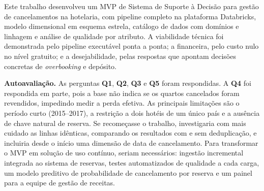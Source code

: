\documentclass[11pt,a4paper]{article}
\newcommand{\Q}[1]{\textbf{Q#1}}
\begin{document}
Este trabalho desenvolveu um MVP de Sistema de Suporte à Decisão para gestão de cancelamentos na hotelaria, com pipeline completo na plataforma Databricks, modelo dimensional em esquema estrela, catálogo de dados com domínios e linhagem e análise de qualidade por atributo. A viabilidade técnica foi demonstrada pelo pipeline executável ponta a ponta; a financeira, pelo custo nulo no nível gratuito; e a desejabilidade, pelas respostas que apontam decisões concretas de \textit{overbooking} e depósito.

\textbf{Autoavaliação.} As perguntas \Q{1}, \Q{2}, \Q{3} e \Q{5} foram respondidas. A \Q{4} foi respondida em parte, pois a base não indica se os quartos cancelados foram revendidos, impedindo medir a perda efetiva. As principais limitações são o período curto (2015--2017), a restrição a dois hotéis de um único país e a ausência de chave natural de reserva. Se recomeçasse o trabalho, investigaria com mais cuidado as linhas idênticas, comparando os resultados com e sem deduplicação, e incluiria desde o início uma dimensão de data de cancelamento. Para transformar o MVP em solução de uso contínuo, seriam necessários: ingestão incremental integrada ao sistema de reservas, testes automatizados de qualidade a cada carga, um modelo preditivo de probabilidade de cancelamento por reserva e um painel para a equipe de gestão de receitas.
\end{document}
